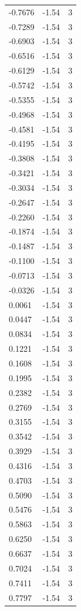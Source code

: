 \begin{longtable}{lrr}
  -0.7676 & -1.54 & 3 \\
  -0.7289 & -1.54 & 3 \\
  -0.6903 & -1.54 & 3 \\
  -0.6516 & -1.54 & 3 \\
  -0.6129 & -1.54 & 3 \\
  -0.5742 & -1.54 & 3 \\
  -0.5355 & -1.54 & 3 \\
  -0.4968 & -1.54 & 3 \\
  -0.4581 & -1.54 & 3 \\
  -0.4195 & -1.54 & 3 \\
  -0.3808 & -1.54 & 3 \\
  -0.3421 & -1.54 & 3 \\
  -0.3034 & -1.54 & 3 \\
  -0.2647 & -1.54 & 3 \\
  -0.2260 & -1.54 & 3 \\
  -0.1874 & -1.54 & 3 \\
  -0.1487 & -1.54 & 3 \\
  -0.1100 & -1.54 & 3 \\
  -0.0713 & -1.54 & 3 \\
  -0.0326 & -1.54 & 3 \\
  0.0061 & -1.54 & 3 \\
  0.0447 & -1.54 & 3 \\
  0.0834 & -1.54 & 3 \\
  0.1221 & -1.54 & 3 \\
  0.1608 & -1.54 & 3 \\
  0.1995 & -1.54 & 3 \\
  0.2382 & -1.54 & 3 \\
  0.2769 & -1.54 & 3 \\
  0.3155 & -1.54 & 3 \\
  0.3542 & -1.54 & 3 \\
  0.3929 & -1.54 & 3 \\
  0.4316 & -1.54 & 3 \\
  0.4703 & -1.54 & 3 \\
  0.5090 & -1.54 & 3 \\
  0.5476 & -1.54 & 3 \\
  0.5863 & -1.54 & 3 \\
  0.6250 & -1.54 & 3 \\
  0.6637 & -1.54 & 3 \\
  0.7024 & -1.54 & 3 \\
  0.7411 & -1.54 & 3 \\
  0.7797 & -1.54 & 3 \\

\end{longtable}
